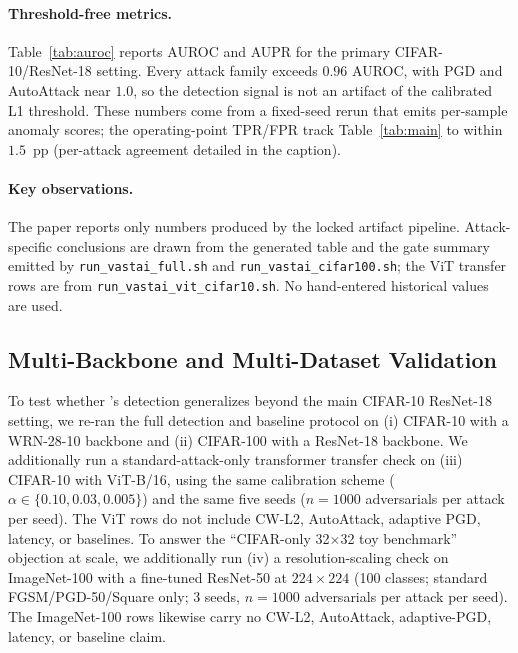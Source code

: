 \paragraph{Threshold-free metrics.}
Table~\ref{tab:auroc} reports AUROC and AUPR for the primary CIFAR-10/ResNet-18
setting. Every attack family exceeds $0.96$ AUROC, with PGD and AutoAttack near
$1.0$, so the detection signal is not an artifact of the calibrated L1 threshold.
These numbers come from a fixed-seed rerun that emits per-sample anomaly scores;
the operating-point TPR/FPR track Table~\ref{tab:main} to within $1.5$~pp
(per-attack agreement detailed in the caption).

\paragraph{Key observations.}
The paper reports only numbers produced by the locked artifact pipeline.
Attack-specific conclusions are drawn from the generated table and the
gate summary emitted by \texttt{run\_vastai\_full.sh} and
\texttt{run\_vastai\_cifar100.sh}; the ViT transfer rows are from
\texttt{run\_vastai\_vit\_cifar10.sh}. No hand-entered historical values
are used.

\subsection{Multi-Backbone and Multi-Dataset Validation}
\label{sec:multi_backbone}

To test whether \prism's detection generalizes beyond the main CIFAR-10
ResNet-18 setting, we re-ran the full detection and baseline protocol on
(i) CIFAR-10 with a WRN-28-10 backbone and (ii) CIFAR-100 with a
ResNet-18 backbone. We additionally run a standard-attack-only
transformer transfer check on (iii) CIFAR-10 with ViT-B/16, using the
same calibration scheme ($\alpha \in \{0.10, 0.03, 0.005\}$) and the
same five seeds ($n=1000$ adversarials per attack per seed). The ViT
rows do not include CW-L2, AutoAttack, adaptive PGD, latency, or
baselines. To answer the ``CIFAR-only 32$\times$32 toy benchmark''
objection at scale, we additionally run (iv) a resolution-scaling check
on ImageNet-100 with a fine-tuned ResNet-50 at $224\times224$ (100
classes; standard FGSM/PGD-50/Square only; 3 seeds, $n=1000$
adversarials per attack per seed). The ImageNet-100 rows likewise carry
no CW-L2, AutoAttack, adaptive-PGD, latency, or baseline claim.

